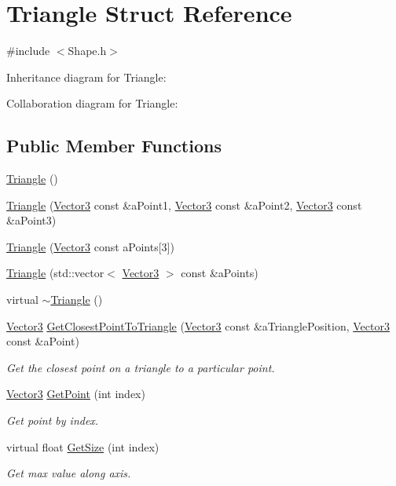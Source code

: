 \hypertarget{structTriangle}{}\section{Triangle Struct Reference}
\label{structTriangle}


{\ttfamily \#include $<$Shape.\+h$>$}



Inheritance diagram for Triangle\+:


Collaboration diagram for Triangle\+:
\subsection*{Public Member Functions}
\begin{DoxyCompactItemize}
\item 
\hyperlink{structTriangle_aaefe4ed500c07918d30c6f0e286332c5}{Triangle} ()
\item 
\hyperlink{structTriangle_a72896d9c8eb009a2c928dd6e5a9fdb7b}{Triangle} (\hyperlink{structVector3}{Vector3} const \&a\+Point1, \hyperlink{structVector3}{Vector3} const \&a\+Point2, \hyperlink{structVector3}{Vector3} const \&a\+Point3)
\item 
\hyperlink{structTriangle_a42baf8fa47d2449f4e978876db52f5f2}{Triangle} (\hyperlink{structVector3}{Vector3} const a\+Points\mbox{[}3\mbox{]})
\item 
\hyperlink{structTriangle_a136fe10c97f213ead183411dc51b45ba}{Triangle} (std\+::vector$<$ \hyperlink{structVector3}{Vector3} $>$ const \&a\+Points)
\item 
virtual \hyperlink{structTriangle_a5199760a17454f4dc94c855a57e3a152}{$\sim$\+Triangle} ()
\item 
\hyperlink{structVector3}{Vector3} \hyperlink{structTriangle_adefabddaa068263e5ced8657c874b284}{Get\+Closest\+Point\+To\+Triangle} (\hyperlink{structVector3}{Vector3} const \&a\+Triangle\+Position, \hyperlink{structVector3}{Vector3} const \&a\+Point)
\begin{DoxyCompactList}\small\item\em Get the closest point on a triangle to a particular point. \end{DoxyCompactList}\item 
\hyperlink{structVector3}{Vector3} \hyperlink{structTriangle_a63c7e102a5cf63dfb89c2c0b45894b82}{Get\+Point} (int index)
\begin{DoxyCompactList}\small\item\em Get point by index. \end{DoxyCompactList}\item 
virtual float \hyperlink{structTriangle_a121aa12b2557c9f523f435253258bcb0}{Get\+Size} (int index)
\begin{DoxyCompactList}\small\item\em Get max value along axis. \end{DoxyCompactList}\end{DoxyCompactItemize}
